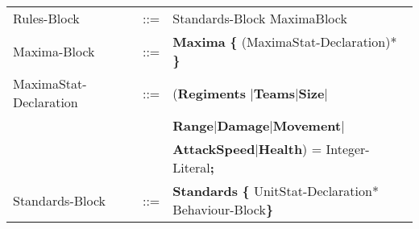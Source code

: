 \begin{center}
\begin{longtable}{ l l l }
	Rules-Block					&	::=	&Standards-Block MaximaBlock 				\\
	Maxima-Block				&	::=	&{\bf Maxima} {\bf \{} (MaximaStat-Declaration)* {\bf \}}\\
	MaximaStat-Declaration	&	::=	&({\bf Regiments }$\mid${\bf Teams}$\mid${\bf Size}$\mid$\\
								&		&{\bf Range}$\mid${\bf Damage}$\mid${\bf Movement}$\mid$\\
								&		&{\bf AttackSpeed}$\mid${\bf Health}) =  Integer-Literal{\bf ;}\\
	Standards-Block				&	::=	&{\bf Standards} {\bf \{ } UnitStat-Declaration* Behaviour-Block\bf{\} }		\\
\end{longtable}
\end{center}	


